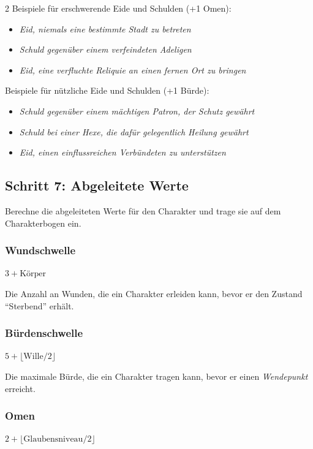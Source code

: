 \begin{multicols*}{2}
Beispiele für erschwerende Eide und Schulden (+1 Omen):
\begin{itemize}[leftmargin=*]
\item \textit{Eid, niemals eine bestimmte Stadt zu betreten}
\item \textit{Schuld gegenüber einem verfeindeten Adeligen}
\item \textit{Eid, eine verfluchte Reliquie an einen fernen Ort zu bringen}
\end{itemize}

Beispiele für nützliche Eide und Schulden (+1 Bürde):
\begin{itemize}[leftmargin=*]
\item \textit{Schuld gegenüber einem mächtigen Patron, der Schutz gewährt}
\item \textit{Schuld bei einer Hexe, die dafür gelegentlich Heilung gewährt}
\item \textit{Eid, einen einflussreichen Verbündeten zu unterstützen}
\end{itemize}


\subsection{Schritt 7: Abgeleitete Werte}\label{subsec:schritt-7:-abgeleitete-werte}

Berechne die abgeleiteten Werte für den Charakter und trage sie auf dem Charakterbogen ein.

\subsubsection{Wundschwelle}
$3 + \text{Körper}$

Die Anzahl an Wunden, die ein Charakter erleiden kann, bevor er den Zustand ``Sterbend'' erhält.

\subsubsection{Bürdenschwelle}
$5 + \lfloor \text{Wille} / 2 \rfloor$

Die maximale Bürde, die ein Charakter tragen kann, bevor er einen \textit{Wendepunkt} erreicht.

\subsubsection{Omen}
$2 + \lfloor \text{Glaubensniveau} / 2 \rfloor$


\end{multicols*}
